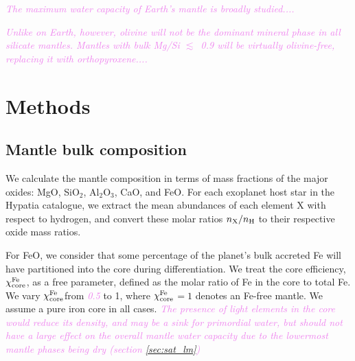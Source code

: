 \documentclass[linenumbers]{aastex631}
\newcommand{\todo}[1]{\textit{\textcolor{violet}{{#1}}}}
\renewcommand{\coreeff}{$\chi^{\rm Fe}_{\rm core}$}
\begin{document}
\todo{The maximum water capacity of Earth's mantle is broadly studied....}


\todo{Unlike on Earth, however, olivine will not be the dominant mineral phase in all silicate mantles. Mantles with bulk Mg/Si $\lesssim$~0.9 will be virtually olivine-free, replacing it with orthopyroxene....}




\section{Methods}

\subsection{Mantle bulk composition}

We calculate the mantle composition in terms of mass fractions of the major oxides: MgO, SiO$_2$, Al$_2$O$_3$, CaO, and FeO. For each exoplanet host star in the Hypatia catalogue, we extract the mean abundances of each element X with respect to hydrogen, and convert these molar ratios $n_{\rm X}/n_{\rm H}$ to their respective oxide mass ratios.

For FeO, we consider that some percentage of the planet's bulk accreted Fe will have partitioned into the core during differentiation. We treat the core efficiency, \coreeff, as a free parameter, defined as the molar ratio of Fe in the core to total Fe. We vary \coreeff from \todo{0.5} to 1, where \coreeff $= 1$ denotes an Fe-free mantle. We assume a pure iron core in all cases. \todo{The presence of light elements in the core would reduce its density, and may be a sink for primordial water, but should not have a large effect on the overall mantle water capacity due to the lowermost mantle phases being dry (section \ref{sec:sat_lm})}
\end{document}

